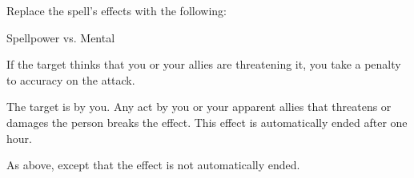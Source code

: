 Replace the spell's effects with the following:
\begin{spellcontent}

\begin{augmenteffects}




\begin{spellattack}{Spellpower vs. Mental}


\spellspecial If the target thinks that you or your allies are threatening it, you take a  penalty to accuracy on the attack.


\spellsuccess
The target is \charmed by you.
Any act by you or your apparent allies that threatens or damages the  person breaks the effect.
This effect is automatically ended after one hour.



\spellcritical
As above, except that the effect is not automatically ended.



\end{spellattack}





\end{augmenteffects}

\end{spellcontent}








